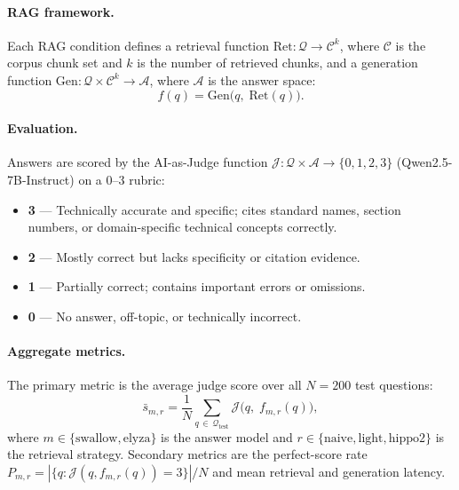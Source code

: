 \documentclass[twocolumn]{article}
\begin{document}
\paragraph{RAG framework.}
Each RAG condition defines a retrieval function
$\mathrm{Ret}: \mathcal{Q} \to \mathcal{C}^k$,
where $\mathcal{C}$ is the corpus chunk set and $k$ is the number of retrieved chunks,
and a generation function
$\mathrm{Gen}: \mathcal{Q} \times \mathcal{C}^k \to \mathcal{A}$,
where $\mathcal{A}$ is the answer space:
\begin{equation}
  f(q) = \mathrm{Gen}\!\bigl(q,\; \mathrm{Ret}(q)\bigr).
  \label{eq:rag}
\end{equation}

\paragraph{Evaluation.}
Answers are scored by the AI-as-Judge function
$\mathcal{J}: \mathcal{Q} \times \mathcal{A} \to \{0,1,2,3\}$
(Qwen2.5-7B-Instruct) on a 0--3 rubric:
\begin{itemize}
  \item \textbf{3} --- Technically accurate and specific; cites standard names,
        section numbers, or domain-specific technical concepts correctly.
  \item \textbf{2} --- Mostly correct but lacks specificity or citation evidence.
  \item \textbf{1} --- Partially correct; contains important errors or omissions.
  \item \textbf{0} --- No answer, off-topic, or technically incorrect.
\end{itemize}

\paragraph{Aggregate metrics.}
The primary metric is the average judge score over all $N=200$ test questions:
\begin{equation}
  \bar{s}_{m,r}
  = \frac{1}{N}\sum_{q\,\in\,\mathcal{Q}_{\mathrm{test}}}
    \mathcal{J}\!\bigl(q,\; f_{m,r}(q)\bigr),
  \label{eq:avg_score}
\end{equation}
where $m \in \{\mathrm{swallow}, \mathrm{elyza}\}$ is the answer model and
$r \in \{\mathrm{naive}, \mathrm{light}, \mathrm{hippo2}\}$ is the retrieval strategy.
Secondary metrics are the perfect-score rate
$P_{m,r} = |\{q : \mathcal{J}(q,f_{m,r}(q))=3\}| / N$
and mean retrieval and generation latency.
\end{document}
